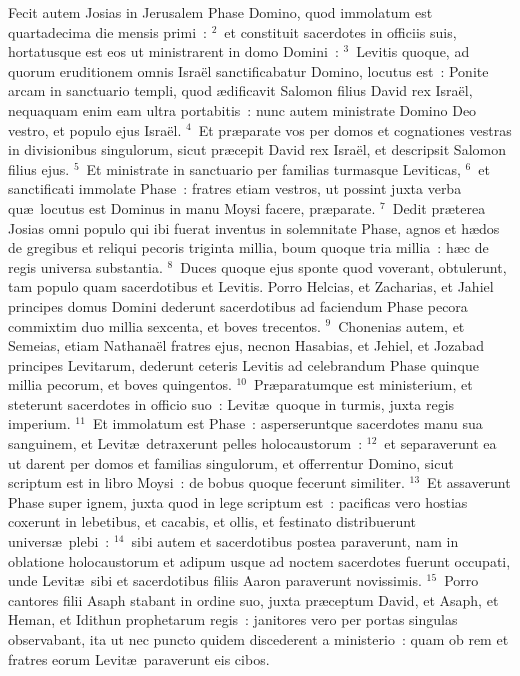 \lettrine[lines=10,image=true,loversize=0.05,lraise=-0.03]{F}{}ecit autem Josias in Jerusalem Phase Domino, quod immolatum est quartadecima die mensis primi~:
${}^{2}$~et constituit sacerdotes in officiis suis, hortatusque est eos ut ministrarent in domo Domini~:
${}^{3}$~Levitis quoque, ad quorum eruditionem omnis Isra\"el sanctificabatur Domino, locutus est~: Ponite arcam in sanctuario templi, quod \ae dificavit Salomon filius David rex Isra\"el, nequaquam enim eam ultra portabitis~: nunc autem ministrate Domino Deo vestro, et populo ejus Isra\"el.
${}^{4}$~Et pr\ae parate vos per domos et cognationes vestras in divisionibus singulorum, sicut pr\ae cepit David rex Isra\"el, et descripsit Salomon filius ejus.
${}^{5}$~Et ministrate in sanctuario per familias turmasque Leviticas,
${}^{6}$~et sanctificati immolate Phase~: fratres etiam vestros, ut possint juxta verba qu\ae\ locutus est Dominus in manu Moysi facere, pr\ae parate.
${}^{7}$~Dedit pr\ae terea Josias omni populo qui ibi fuerat inventus in solemnitate Phase, agnos et h\ae dos de gregibus et reliqui pecoris triginta millia, boum quoque tria millia~: h\ae c de regis universa substantia.
${}^{8}$~Duces quoque ejus sponte quod voverant, obtulerunt, tam populo quam sacerdotibus et Levitis. Porro Helcias, et Zacharias, et Jahiel principes domus Domini dederunt sacerdotibus ad faciendum Phase pecora commixtim duo millia sexcenta, et boves trecentos.
${}^{9}$~Chonenias autem, et Semeias, etiam Nathana\"el fratres ejus, necnon Hasabias, et Jehiel, et Jozabad principes Levitarum, dederunt ceteris Levitis ad celebrandum Phase quinque millia pecorum, et boves quingentos.
${}^{10}$~Pr\ae paratumque est ministerium, et steterunt sacerdotes in officio suo~: Levit\ae\ quoque in turmis, juxta regis imperium.
${}^{11}$~Et immolatum est Phase~: asperseruntque sacerdotes manu sua sanguinem, et Levit\ae\ detraxerunt pelles holocaustorum~:
${}^{12}$~et separaverunt ea ut darent per domos et familias singulorum, et offerrentur Domino, sicut scriptum est in libro Moysi~: de bobus quoque fecerunt similiter.
${}^{13}$~Et assaverunt Phase super ignem, juxta quod in lege scriptum est~: pacificas vero hostias coxerunt in lebetibus, et cacabis, et ollis, et festinato distribuerunt univers\ae\ plebi~:
${}^{14}$~sibi autem et sacerdotibus postea paraverunt, nam in oblatione holocaustorum et adipum usque ad noctem sacerdotes fuerunt occupati, unde Levit\ae\ sibi et sacerdotibus filiis Aaron paraverunt novissimis.
${}^{15}$~Porro cantores filii Asaph stabant in ordine suo, juxta pr\ae ceptum David, et Asaph, et Heman, et Idithun prophetarum regis~: janitores vero per portas singulas observabant, ita ut nec puncto quidem discederent a ministerio~: quam ob rem et fratres eorum Levit\ae\ paraverunt eis cibos.
